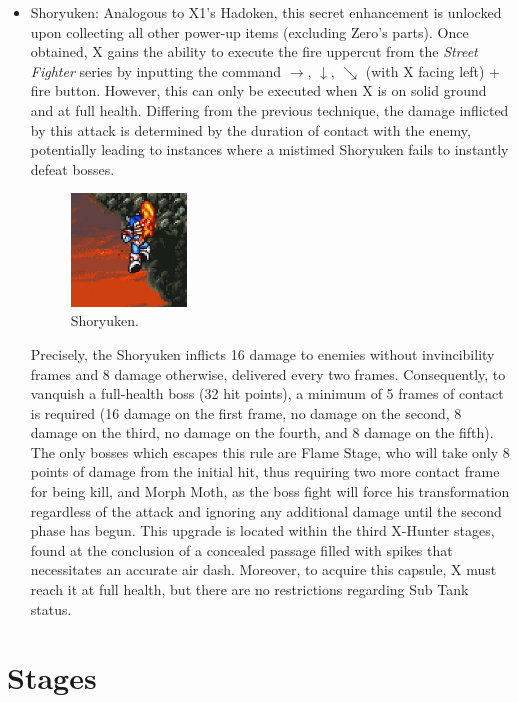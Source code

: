 \begin{itemize}
\item Shoryuken\label{shoryuken}: Analogous to X1's Hadoken, this secret enhancement is unlocked upon collecting all other power-up items (excluding Zero's parts). Once obtained, X gains the ability to execute the fire uppercut from the \textit{Street Fighter} series by inputting the command $\rightarrow$, $ \downarrow$, $\searrow$ (with X facing left) + fire button. However, this can only be executed when X is on solid ground and at full health. Differing from the previous technique, the damage inflicted by this attack is determined by the duration of contact with the enemy, potentially leading to instances where a mistimed Shoryuken fails to instantly defeat bosses.
	\begin{figure}[htp]
	\centering
	\includegraphics[height=3cm]{figures/X2/weapons/Shoryuken.png}
	\caption{Shoryuken.}
\end{figure} Precisely, the Shoryuken inflicts 16 damage to enemies without invincibility frames and 8 damage otherwise, delivered every two frames. Consequently, to vanquish a full-health boss (32 hit points), a minimum of 5 frames of contact is required (16 damage on the first frame, no damage on the second, 8 damage on the third, no damage on the fourth, and 8 damage on the fifth). The only bosses which escapes this rule are Flame Stage, who will take only 8 points of damage from the initial hit, thus requiring two more contact frame for being kill, and Morph Moth, as the boss fight will force his transformation regardless of the attack and ignoring any additional damage until the second phase has begun. This upgrade is located within the third X-Hunter stages, found at the conclusion of a concealed passage filled with spikes that necessitates an accurate air dash. Moreover, to acquire this capsule, X must reach it at full health, but there are no restrictions regarding Sub Tank status.
\end{itemize}

\chapter{Stages}	

